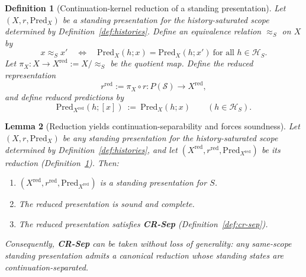 \documentclass[11pt]{article}
\newtheorem{definition}{Definition}[section]
\newtheorem{lemma}[definition]{Lemma}
\theoremstyle{remark}
\newcommand{\Skin}{\mathcal{S}}
\begin{document}
\begin{definition}[Continuation-kernel reduction of a standing presentation]\label{def:cr-reduction}
Let $(X,r,\mathrm{Pred}_X)$ be a standing presentation for the history-saturated scope determined by
Definition~\ref{def:histories}. Define an equivalence relation $\approx_S$ on $X$ by
\[
x\approx_S x' \quad\Longleftrightarrow\quad \mathrm{Pred}_X(h;x)=\mathrm{Pred}_X(h;x')\ \text{for all }h\in\mathcal{H}_S .
\]
Let $\pi_X:X\to X^{\mathrm{red}}:=X/\!\approx_S$ be the quotient map. Define the \emph{reduced} representation
\[
r^{\mathrm{red}}:=\pi_X\circ r : P(\Skin)\to X^{\mathrm{red}},
\]
and define reduced predictions by
\begin{equation}\label{eq:PredXred}
\mathrm{Pred}_{X^{\mathrm{red}}}(h;[x])\ :=\ \mathrm{Pred}_X(h;x)\qquad (h\in\mathcal{H}_S).
\end{equation}
\end{definition}

\begin{lemma}[Reduction yields continuation-separability and forces soundness]\label{lem:cr-reduction}
Let $(X,r,\mathrm{Pred}_X)$ be any standing presentation for the history-saturated scope determined by
Definition~\ref{def:histories}, and let $(X^{\mathrm{red}},r^{\mathrm{red}},\mathrm{Pred}_{X^{\mathrm{red}}})$
be its reduction (Definition~\ref{def:cr-reduction}). Then:
\begin{enumerate}[label=(\roman*),leftmargin=2.2em]
\item $(X^{\mathrm{red}},r^{\mathrm{red}},\mathrm{Pred}_{X^{\mathrm{red}}})$ is a standing presentation for $S$.
\item The reduced presentation is sound and complete.
\item The reduced presentation satisfies \textbf{CR-Sep} (Definition~\ref{def:cr-sep}).
\end{enumerate}
Consequently, \textbf{CR-Sep} can be taken \emph{without loss of generality}: any same-scope standing presentation
admits a canonical reduction whose standing states are continuation-separated.
\end{lemma}
\end{document}
